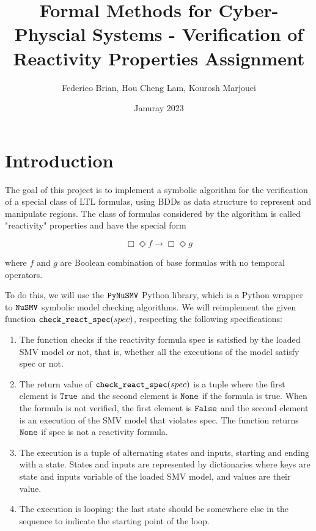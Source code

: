 \documentclass{article}
\title{Formal Methods for Cyber-Physcial Systems - Verification of Reactivity Properties Assignment}
\author{Federico Brian, Hou Cheng Lam, Kourosh Marjouei}
\date{Januray 2023}
\begin{document}
\maketitle
\tableofcontents

\newpage

\section{Introduction}

The goal of this project is to implement a symbolic algorithm for the verification of a special class of LTL formulas, using BDDs as data structure to represent and manipulate regions. The class of formulas considered by the algorithm is called "reactivity" properties and have the special form

\[ \Box\Diamond f \rightarrow \Box\Diamond g\]

where $f$ and $g$ are Boolean combination of base formulas with no temporal operators.

\medskip

To do this, we will use the $\verb|PyNuSMV|$ Python library, which is a Python wrapper to $\verb|NuSMV|$ symbolic model checking algorithms. We will reimplement the given function $\verb|check_react_spec|(spec)$, respecting the following specifications:

\begin{enumerate}
	\item The function checks if the reactivity formula spec is satisfied by the loaded SMV model or not, that is, whether all the executions of the model satisfy spec or not.
	\item The return value of $\verb|check_react_spec|(spec)$ is a tuple where the first element is $\verb|True|$ and the second element is $\verb|None|$ if the formula is true. When the formula is not verified, the first element is $\verb|False|$ and the second element is an execution of the SMV model that violates spec. The function returns $\verb|None|$ if spec is not a reactivity formula.
	\item The execution is a tuple of alternating states and inputs, starting and ending with a state. States and inputs are represented by dictionaries where keys are state and inputs variable of the loaded SMV model, and values are their value.
	\item The execution is looping: the last state should be somewhere else in the sequence to indicate the starting point of the loop. 
\end{enumerate}
\end{document}
